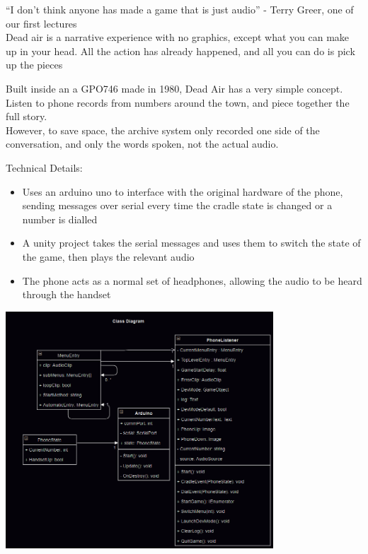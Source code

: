 \documentclass{article}
\begin{document}
\begin{multicols}{2}
    \columnbreak %
    \begin{center}
        \begin{Large}
            “I don't think anyone has made a game that is just audio” - Terry Greer, one of our first lectures\\
            Dead air is a narrative experience with no graphics, except what you can make up in your head. 
            All the action has already happened, and all you can do is pick up the pieces\\
        \end{Large}
        \vspace{0.5cm}
        \begin{large}
            Built inside an a GPO746 made in 1980, Dead Air has a very simple concept. 
            Listen to phone records from numbers around the town, and piece together the full story.\\
            However, to save space, the archive system only recorded one side of the conversation, 
            and only the words spoken, not the actual audio.\\
        \end{large}
        \vspace{0.5cm}
        \begin{large}
            Technical Details:
            \begin{itemize}
                \item Uses an arduino uno to interface with the original hardware of the phone, 
                sending messages over serial every time the cradle state is changed or a number is 
                dialled
                \item A unity project takes the serial messages and uses them to switch the state of 
                the game, then plays the relevant audio
                \item The phone acts as a normal set of headphones, allowing the audio to be heard 
                through the handset
            \end{itemize}
        \end{large}
        \includegraphics[width=10cm]{ClassDiagramDark}\\
    \end{center}
    
    

    \end{multicols}
\end{document}
